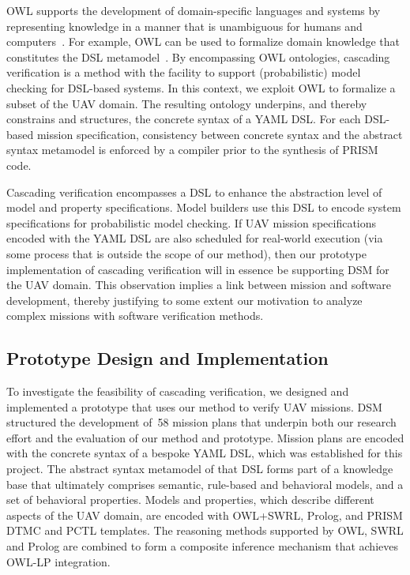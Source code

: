 OWL supports the development of domain-specific languages and systems by representing knowledge in a manner that is unambiguous for humans and computers~\cite{Musen_2004,Walter_2009}. For example, OWL can be used to formalize domain knowledge that constitutes the DSL metamodel~\cite{Walter_2009}. By encompassing OWL ontologies, cascading verification is a method with the facility to support (probabilistic) model checking for DSL-based systems. In this context, we exploit OWL to formalize a subset of the UAV domain. The resulting ontology underpins, and thereby constrains and structures, the concrete syntax of a YAML DSL\@. For each DSL-based mission specification, consistency between concrete syntax and the abstract syntax metamodel is enforced by a compiler prior to the synthesis of PRISM code.

Cascading verification encompasses a DSL to enhance the abstraction level of model and property specifications. Model builders use this DSL to encode system specifications for probabilistic model checking. If UAV mission specifications encoded with the YAML DSL are also scheduled for real-world execution (via some process that is outside the scope of our method), then our prototype implementation of cascading verification will in essence be supporting DSM for the UAV domain. This observation implies a link between mission and software development, thereby justifying to some extent our motivation to analyze complex missions with software verification methods.

\subsection{Prototype Design and Implementation}

To investigate the feasibility of cascading verification, we designed and implemented a prototype that uses our method to verify UAV missions. DSM structured the development of~58 mission plans that underpin both our research effort and the evaluation of our method and prototype. Mission plans are encoded with the concrete syntax of a bespoke YAML DSL, which was established for this project. The abstract syntax metamodel of that DSL forms part of a knowledge base that ultimately comprises semantic, rule-based and behavioral models, and a set of behavioral properties. Models and properties, which describe different aspects of the UAV domain, are encoded with OWL+SWRL, Prolog, and PRISM DTMC and PCTL templates. The reasoning methods supported by OWL, SWRL and Prolog are combined to form a composite inference mechanism that achieves OWL-LP integration.

